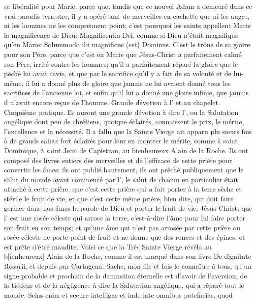sa libéralité pour Marie, parce que, tandis que ce nouvel Adam a demeuré dans ce vrai paradis terrestre, il y a
opéré tant de merveilles en cachette que ni les anges, ni les hommes ne les comprennent point; c'est pourquoi les
saints appellent Marie la magnificence de Dieu: Magnificentia Dei, comme si Dieu n'était magnifique qu'en Marie:
Solummodo ibi magnificus (est) Dominus. C'est le trône de sa gloire pour son Père, parce que c'est en Marie que
Jésus-Christ a parfaitement calmé son Père, irrité contre les hommes; qu'il a parfaitement réparé la gloire que le
péché lui avait ravie, et que par le sacrifice qu'il y a fait de sa volonté et de lui-même, il lui a donné plus de gloire
que jamais ne lui avaient donné tous les sacrifices de l'ancienne loi, et enfin qu'il lui a donné une gloire infinie, que
jamais il n'avait encore reçue de l'homme.
Grande dévotion à l' et au chapelet.
 Cinquième pratique. Ils auront une grande dévotion à dire l', ou la Salutation angélique dont peu de
chrétiens, quoique éclairés, connaissent le prix, le mérite, l'excellence et la nécessité. Il a fallu que la Sainte Vierge
ait apparu plu sieurs fois à de grands saints fort éclairés pour leur en montrer le mérite, comme à saint Dominique,
à saint Jean de Capistran, au bienheureux Alain de la Roche. Ils ont composé des livres entiers des merveilles et
de l'efficace de cette prière pour convertir les âmes; ils ont publié hautement, ils ont prêché publiquement que le
salut du monde ayant commencé par l', le salut de chacun en particulier était attaché à cette prière; que
c'est cette prière qui a fait porter à la terre sèche et stérile le fruit de vie, et que c'est cette même prière, bien dite,
qui doit faire germer dans nos âmes la parole de Dieu et porter le fruit de vie, Jésus-Christ; que l' est une
rosée céleste qui arrose la terre, c'est-à-dire l'âme pour lui faire porter son fruit en son temps; et qu'une âme qui
n'est pas arrosée par cette prière ou rosée céleste ne porte point de fruit et ne donne que des ronces et des
épines, et est prête d'être maudite.
 Voici ce que la Très Sainte Vierge révéla au b[ienheureux] Alain de la Roche, comme il est marqué dans son
livre De dignitate Rosarii, et depuis par Cartagena: Sache, mon fils et fais-le connaître à tous, qu'un signe probable
et prochain de la damnation éternelle est d'avoir de l'aversion, de la tiédeur et de la négligence à dire la Salutation
angélique, qui a réparé tout le monde: Scias enim et secure intelligas et inde late omnibus patefacias, quod
